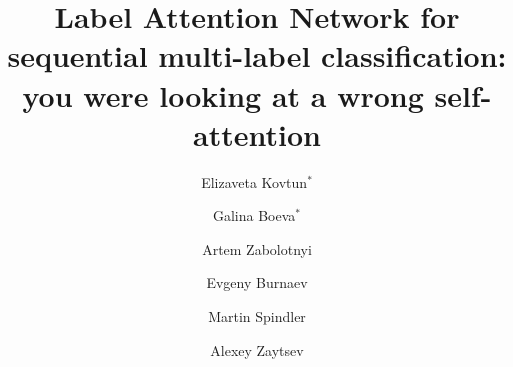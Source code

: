 \documentclass[runningheads]{llncs}
\begin{document}
\title{Label Attention Network for sequential multi-label classification: you were looking at a wrong self-attention}
%
%


\author{Elizaveta Kovtun$^*$ \and
Galina Boeva$^*$ \and
Artem Zabolotnyi \and
Evgeny Burnaev \and 
Martin Spindler \and
Alexey Zaytsev}
%
\def\thefootnote{*}

%
\maketitle              %
\end{document}
